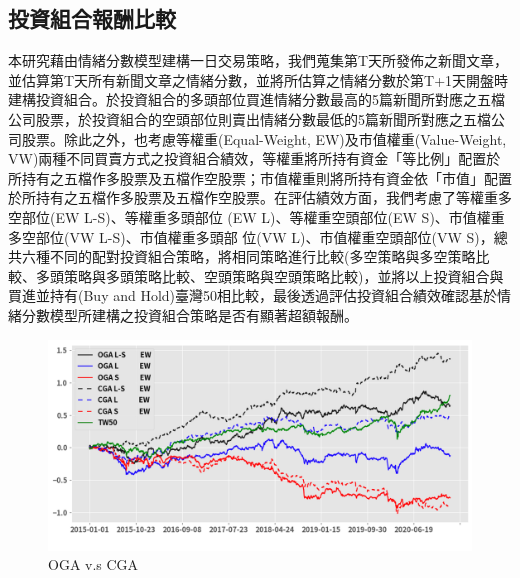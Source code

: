 \subsection{投資組合報酬比較}
本研究藉由情緒分數模型建構一日交易策略，我們蒐集第T天所發佈之新聞文章，並估算第T天所有新聞文章之情緒分數，並將所估算之情緒分數於第T+1天開盤時建構投資組合。於投資組合的多頭部位買進情緒分數最高的5篇新聞所對應之五檔公司股票，於投資組合的空頭部位則賣出情緒分數最低的5篇新聞所對應之五檔公司股票。除此之外，也考慮等權重(Equal-Weight, EW)及市值權重(Value-Weight, VW)兩種不同買賣方式之投資組合績效，等權重將所持有資金「等比例」配置於所持有之五檔作多股票及五檔作空股票；市值權重則將所持有資金依「市值」配置於所持有之五檔作多股票及五檔作空股票。在評估績效方面，我們考慮了等權重多空部位(EW L-S)、等權重多頭部位 (EW L)、等權重空頭部位(EW S)、市值權重多空部位(VW L-S)、市值權重多頭部 位(VW L)、市值權重空頭部位(VW S)，總共六種不同的配對投資組合策略，將相同策略進行比較(多空策略與多空策略比較、多頭策略與多頭策略比較、空頭策略與空頭策略比較)，並將以上投資組合與買進並持有(Buy and Hold)臺灣50相比較，最後透過評估投資組合績效確認基於情緒分數模型所建構之投資組合策略是否有顯著超額報酬。

\newpage

\begin{figure}[htbp]
\centering
\includegraphics[width=1.1\textwidth]{images/OGA vs CGA.png}
\caption{OGA v.s CGA}
\end{figure}

